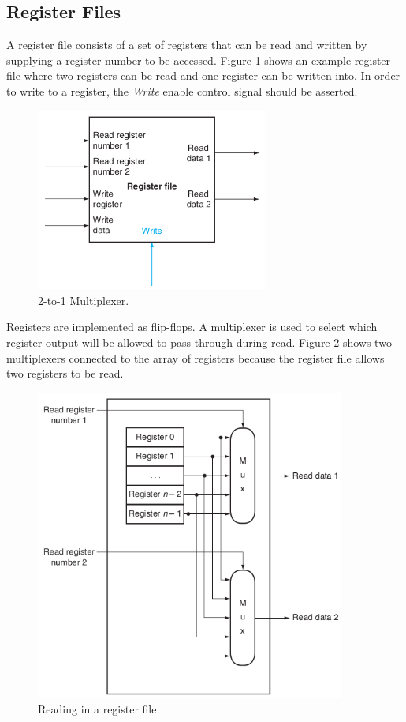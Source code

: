 \documentclass[a4paper, 11pt,oneside]{article}
\begin{document}
\subsection{Register Files}
A register file consists of a set of registers that can be read and written by
supplying a register number to be accessed. Figure \ref{fig:rf0} shows an 
example register file where two registers can be read and one register can be 
written into. In order to write to a register, the \textit{Write} enable
control signal should be asserted.

\begin{figure}[H]
	\begin{center}
	\includegraphics[width=3in]{rf0.png}
	\caption{2-to-1 Multiplexer.}
	\label{fig:rf0} 
	\end{center}
\end{figure}

Registers are implemented as flip-flops. A multiplexer is used to select which
register output will be allowed to pass through during read. Figure 
\ref{fig:rf1} shows two multiplexers connected to the array of registers because
the register file allows two registers to be read.

\begin{figure}[H]
	\begin{center}
	\includegraphics[width=4in]{rf1.png}
	\caption{Reading in a register file.}
	\label{fig:rf1} 
	\end{center}
\end{figure}
\end{document}
